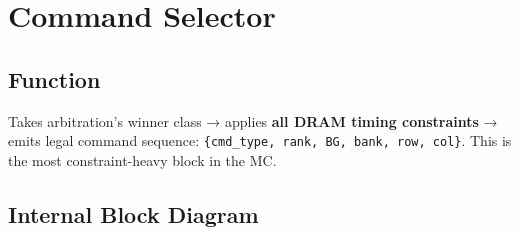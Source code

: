 \documentclass[11pt,a4paper]{article}
\begin{document}
\section{Command Selector}

\subsection{Function}

Takes arbitration's winner class → applies \textbf{all DRAM timing constraints}
→ emits legal command sequence: \texttt{\{cmd\_type, rank, BG, bank, row, col\}}.
This is the most constraint-heavy block in the MC.

\subsection{Internal Block Diagram}
\end{document}

